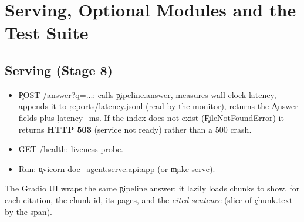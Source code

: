 \chapter{Serving, Optional Modules and the Test Suite}
\section{Serving (Stage 8)}
\begin{itemize}
 \item \c{POST /answer?q=...}: calls \c{pipeline.answer}, measures wall-clock latency, appends it to \c{reports/latency.jsonl} (read by the monitor), returns the \c{Answer} fields plus \c{latency\_ms}. If the index does not exist (\c{FileNotFoundError}) it returns \textbf{HTTP 503} (service not ready) rather than a 500 crash.
 \item \c{GET /health}: liveness probe.
 \item Run: \c{uvicorn doc\_agent.serve.api:app} (or \c{make serve}).
\end{itemize}
The Gradio UI wraps the same \c{pipeline.answer}; it lazily loads chunks to show, for each citation, the chunk id, its pages, and the \emph{cited sentence} (slice of \c{chunk.text} by the span).

